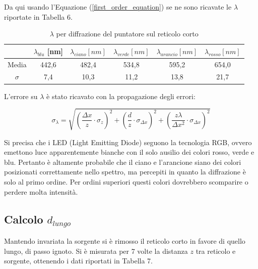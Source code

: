 \documentclass{article}
\begin{document}
Da qui usando l'Equazione (\ref{first_order_equation}) se ne sono ricavate le $\lambda$ riportate in Tabella 6.

\begin{table}[h]
    \centering
\begin{tabular}{||c|c|c|c|c|c||}
    \hline
     & \cellcolor{blue}$\lambda_{blu}$ [nm] & \cellcolor{cyan}$\lambda_{ciano} [nm]$ & \cellcolor{green}$\lambda_{verde}[nm]$ & \cellcolor{orange}$\lambda_{arancio}[nm]$ & \cellcolor{red}$\lambda_{rosso}[nm]$ \\
    \hline
    Media & 442,6 & 482,4 & 534,8 & 595,2 & 654,0 \\
    $\sigma$ & 7,4 & 10,3 & 11,2 & 13,8 & 21,7\\
    \hline
\end{tabular}
\caption{$\lambda$ per diffrazione del puntatore sul reticolo corto}
\end{table}

\pagebreak
L'errore su $\lambda$ è stato ricavato con la propagazione degli errori:

\begin{equation}
        \sigma_\lambda =  \sqrt{\left(\frac{\Delta x}{z}\cdot\sigma_z\right)^2 + \left(\frac{d}{z}\cdot\sigma_{\Delta x}\right)^2 + \left(\frac{z \lambda}{\Delta x^2}\cdot\sigma_{\Delta x}\right)^2}
    \label{lambda_error}
\end{equation}

\vspace{3mm}

Si precisa che i LED (Light Emitting Diode) seguono la tecnologia RGB, ovvero emettono luce apparentemente bianche con il solo ausilio dei colori rosso, verde e blu. Pertanto è altamente probabile che il ciano e l'arancione siano dei colori posizionati correttamente nello spettro, ma percepiti in quanto la diffrazione è solo al primo ordine. Per ordini superiori questi colori dovrebbero scomparire o perdere molta intensità.



\subsection{Calcolo \textrm{$d_{lungo}$}}

Mantendo invariata la sorgente si è rimosso il reticolo corto in favore di quello lungo, di passo ignoto. Si è misurata per 7 volte la distanza $z$ tra reticolo e sorgente, ottenendo i dati riportati in Tabella 7.
\end{document}
